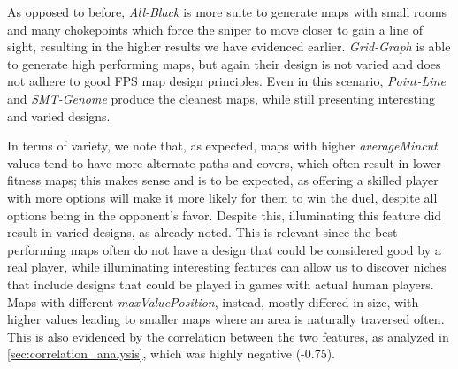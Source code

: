 As opposed to before, \textit{All-Black} is more suite to generate maps with small rooms and many chokepoints which force the sniper to move closer to gain a line of sight, resulting in the higher results we have evidenced earlier. \textit{Grid-Graph} is able to generate high performing maps, but again their design is not varied and does not adhere to good FPS map design principles. Even in this scenario, \textit{Point-Line} and \textit{SMT-Genome} produce the cleanest maps, while still presenting interesting and varied designs.

In terms of variety, we note that, as expected, maps with higher \textit{averageMincut} values tend to have more alternate paths and covers, which often result in lower fitness maps; this makes sense and is to be expected, as offering a skilled player with more options will make it more likely for them to win the duel, despite all options being in the opponent's favor. Despite this, illuminating this feature did result in varied designs, as already noted. This is relevant since the best performing maps often do not have a design that could be considered good by a real player, while illuminating interesting features can allow us to discover niches that include designs that could be played in games with actual human players. Maps with different \textit{maxValuePosition}, instead, mostly differed in size, with higher values leading to smaller maps where an area is naturally traversed often. This is also evidenced by the correlation between the two features, as analyzed in \cref{sec:correlation_analysis}, which was highly negative (-0.75).

